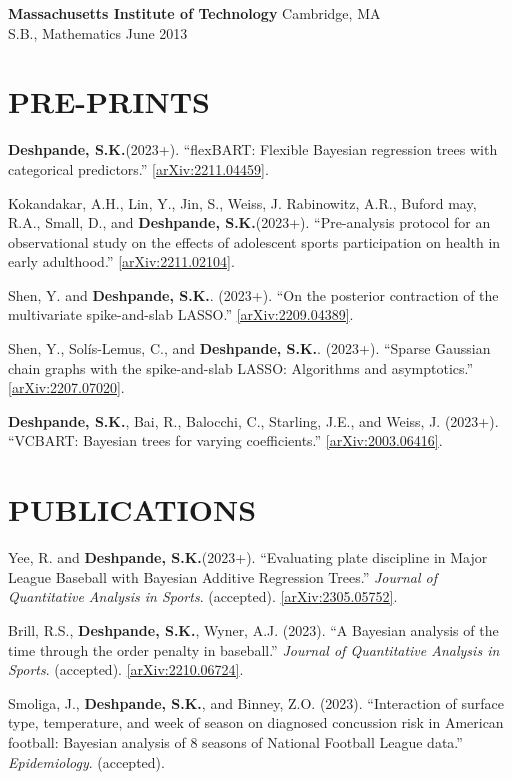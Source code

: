 \documentclass[margin]{res}
\def\skd{\textbf{Deshpande, S.K.}}
\begin{document}
\begin{resume}
                {\bf Massachusetts Institute of Technology} \hfill Cambridge, MA \\
                S.B., Mathematics \hfill June 2013 
  
  
\section{PRE-PRINTS}

\skd (2023+). ``flexBART: Flexible Bayesian regression trees with categorical predictors.'' \href{https://arxiv.org/abs/2211.04459}{[arXiv:2211.04459]}.

Kokandakar, A.H., Lin, Y., Jin, S., Weiss, J. Rabinowitz, A.R., Buford may, R.A., Small, D., and \skd (2023+). ``Pre-analysis protocol for an observational study on the effects of adolescent sports participation on health in early adulthood.'' \href{https://arxiv.org/abs/2211.02104}{[arXiv:2211.02104]}.

Shen, Y. and \skd. (2023+). ``On the posterior contraction of the multivariate spike-and-slab LASSO.'' \href{https://arxiv.org/abs/2209.04389}{[arXiv:2209.04389]}.

Shen, Y., Sol\'{i}s-Lemus, C., and \skd. (2023+). ``Sparse Gaussian chain graphs with the spike-and-slab LASSO: Algorithms and asymptotics.'' \href{https://arxiv.org/abs/2207.07020}{[arXiv:2207.07020]}.

\skd, Bai, R., Balocchi, C., Starling, J.E., and Weiss, J. (2023+). ``VCBART: Bayesian trees for varying coefficients.'' \href{https://arxiv.org/abs/2003.06416}{[arXiv:2003.06416]}. %

\section{PUBLICATIONS}

Yee, R. and \skd (2023+). ``Evaluating plate discipline in Major League Baseball with Bayesian Additive Regression Trees.'' \textit{Journal of Quantitative Analysis in Sports}. (accepted). \href{https://arxiv.org/abs/2305.05752}{[arXiv:2305.05752]}.

Brill, R.S., \skd, Wyner, A.J. (2023). ``A Bayesian analysis of the time through the order penalty in baseball.'' \textit{Journal of Quantitative Analysis in Sports}. (accepted). \href{https://arxiv.org/abs/2210.06724}{[arXiv:2210.06724]}.

Smoliga, J., \skd, and Binney, Z.O. (2023). ``Interaction of surface type, temperature, and week of season on diagnosed concussion risk in American football: {Bayesian} analysis of 8 seasons of National Football League data.'' \textit{Epidemiology}. (accepted).


\end{resume}
\end{document}
